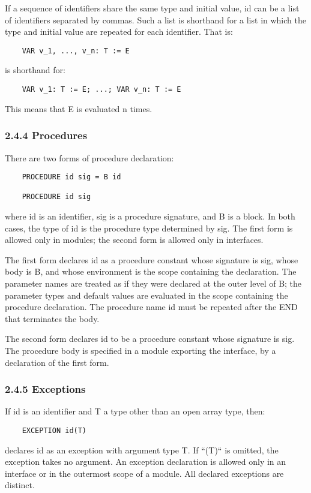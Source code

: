 \documentclass[10pt]{article}
\begin{document}
  If a sequence of identifiers share the same type and initial value, id can be a list of identifiers separated by commas. Such a list is shorthand for a list in which the type and initial value are repeated for each identifier. That is: 
\begin{verbatim}
    VAR v_1, ..., v_n: T := E
\end{verbatim}
 is shorthand for: 
\begin{verbatim}
    VAR v_1: T := E; ...; VAR v_n: T := E
\end{verbatim}
 This means that E is evaluated n times. 


 
\subsubsection*{2.4.4 Procedures}


  There are two forms of procedure declaration: 
\begin{verbatim}
    PROCEDURE id sig = B id

    PROCEDURE id sig
\end{verbatim}
 where id is an identifier, sig is a procedure signature, and B is a block. In both cases, the type of id is the procedure type determined by sig. The first form is allowed only in modules; the second form is allowed only in interfaces. 


 The first form declares id as a procedure constant whose signature is sig, whose body is B, and whose environment is the scope containing the declaration. The parameter names are treated as if they were declared at the outer level of B; the parameter types and default values are evaluated in the scope containing the procedure declaration. The procedure name id must be repeated after the END that terminates the body. 


  The second form declares id to be a procedure constant whose signature is sig. The procedure body is specified in a module exporting the interface, by a declaration of the first form. 


 
\subsubsection*{2.4.5 Exceptions}


  If id is an identifier and T a type other than an open array type, then: 
\begin{verbatim}
    EXCEPTION id(T)
\end{verbatim}
 declares id as an exception with argument type T. If ``(T)`` is omitted, the exception takes no argument. An exception declaration is allowed only in an interface or in the outermost scope of a module. All declared exceptions are distinct. 
\end{document}
